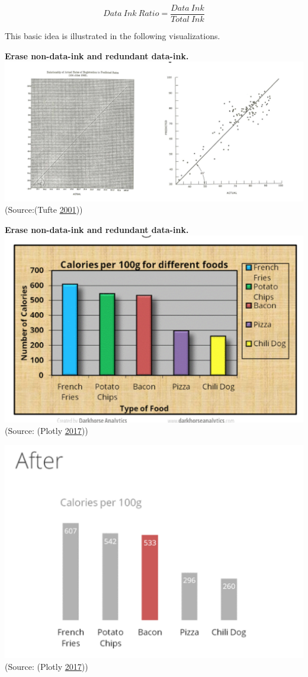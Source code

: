 \documentclass[]{book}
\theoremstyle{definition}
\theoremstyle{definition}
\theoremstyle{definition}
\theoremstyle{remark}
\begin{document}
\[{Data \ Ink \ Ratio} = \frac{{Data \ Ink}}{{Total \ Ink}}\]

This basic idea is illustrated in the following visualizations.

\textbf{Erase non-data-ink and redundant data-ink.}
\includegraphics{images/Tufte_figure1.png} (Source:(Tufte
\protect\hyperlink{ref-Tufte_2001}{2001}))

\textbf{Erase non-data-ink and redundant data-ink.}
\includegraphics{images/Tufte_figure2.png} (Source: (Plotly
\protect\hyperlink{ref-appli_2017}{2017}))

\includegraphics{images/Tufte_figure3.png} (Source: (Plotly
\protect\hyperlink{ref-appli_2017}{2017}))
\end{document}
